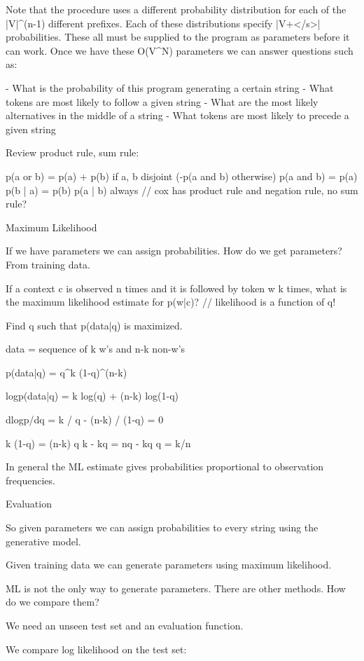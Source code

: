 Note that the procedure uses a different probability distribution for
each of the |V|^(n-1) different prefixes.  Each of these distributions
specify |V+</s>| probabilities.  These all must be supplied to the
program as parameters before it can work.  Once we have these O(V^N)
parameters we can answer questions such as:

- What is the probability of this program generating a certain string
- What tokens are most likely to follow a given string
- What are the most likely alternatives in the middle of a string
- What tokens are most likely to precede a given string

Review product rule, sum rule:

p(a or b) = p(a) + p(b) if a, b disjoint (-p(a and b) otherwise)
p(a and b) = p(a) p(b | a) = p(b) p(a | b)  always
// cox has product rule and negation rule, no sum rule?



Maximum Likelihood

If we have parameters we can assign probabilities.  How do we get
parameters?  From training data.

If a context c is observed n times and it is followed by token w k
times, what is the maximum likelihood estimate for p(w|c)?
// likelihood is a function of q!

Find q such that p(data|q) is maximized.

data = sequence of k w's and n-k non-w's

p(data|q) = q^k (1-q)^(n-k)

logp(data|q) = k log(q) + (n-k) log(1-q)

dlogp/dq = k / q - (n-k) / (1-q) = 0

k (1-q)  = (n-k) q
k - kq = nq - kq
q = k/n

In general the ML estimate gives probabilities proportional to
observation frequencies.



Evaluation

So given parameters we can assign probabilities to every string using
the generative model.

Given training data we can generate parameters using maximum
likelihood.

ML is not the only way to generate parameters.  There are other
methods.  How do we compare them?  

We need an unseen test set and an evaluation function.

We compare log likelihood on the test set:


